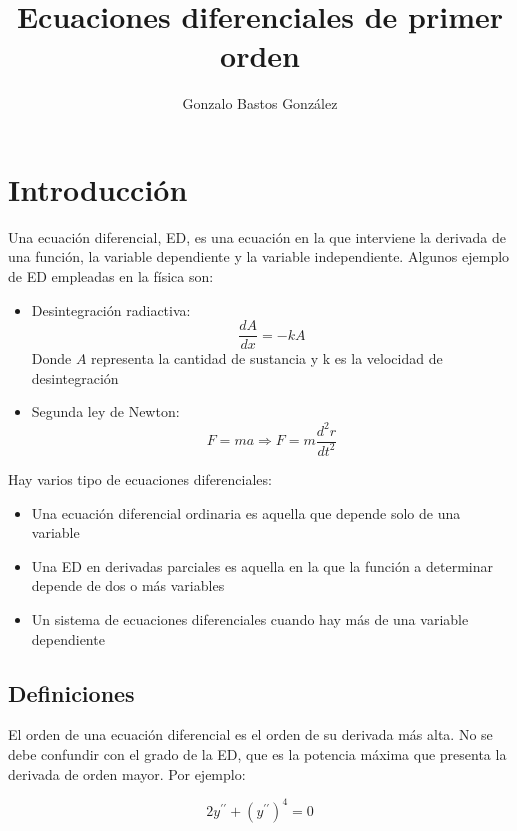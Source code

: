 \documentclass[a4paper,12pt,titlepage]{article}
\title{Ecuaciones diferenciales de primer orden}
\author{Gonzalo Bastos González}
\begin{document}
\maketitle
\tableofcontents

\section{Introducción}

Una ecuación diferencial, ED, es una ecuación en la que interviene la derivada de una función, la variable dependiente y la variable independiente. Algunos ejemplo de ED empleadas en la física son:

\begin{itemize}
    \item Desintegración radiactiva:
    \begin{equation*}
        \frac{dA}{dx} = -kA
    \end{equation*}
    Donde $A$ representa la cantidad de sustancia y k es la velocidad de desintegración
    \item Segunda ley de Newton:
    \begin{equation*}
        F=ma \Rightarrow F= m \frac{d^2r}{dt^2}
    \end{equation*}
\end{itemize}

Hay varios tipo de ecuaciones diferenciales:

\begin{itemize}
    \item Una ecuación diferencial ordinaria es aquella que depende solo de una variable
    \item Una ED en derivadas parciales es aquella en la que la función a determinar depende de dos o más variables
    \item Un sistema de ecuaciones diferenciales cuando hay más de una variable dependiente
\end{itemize}

\subsection{Definiciones}

El orden de una ecuación diferencial es el orden de su derivada más alta. No se debe confundir con el grado de la ED, que es la potencia máxima que presenta la derivada de orden mayor. Por ejemplo:

\begin{equation*}
    2y^{\prime \prime} + (y^{\prime \prime})^4 = 0
\end{equation*}
\end{document}
